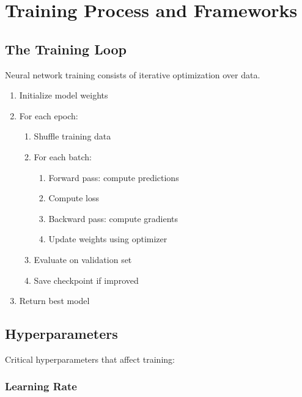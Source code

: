 %

\clearpage
\cleardoublepage

\chapter{Training Process and Frameworks}

\section{The Training Loop}

Neural network training consists of iterative optimization over data.

\begin{algorithm}
\begin{enumerate}
    \item Initialize model weights
    \item For each epoch:
    \begin{enumerate}
        \item Shuffle training data
        \item For each batch:
        \begin{enumerate}
            \item Forward pass: compute predictions
            \item Compute loss
            \item Backward pass: compute gradients
            \item Update weights using optimizer
        \end{enumerate}
        \item Evaluate on validation set
        \item Save checkpoint if improved
    \end{enumerate}
    \item Return best model
\end{enumerate}
\end{algorithm}

\section{Hyperparameters}

Critical hyperparameters that affect training:

\subsection{Learning Rate}

